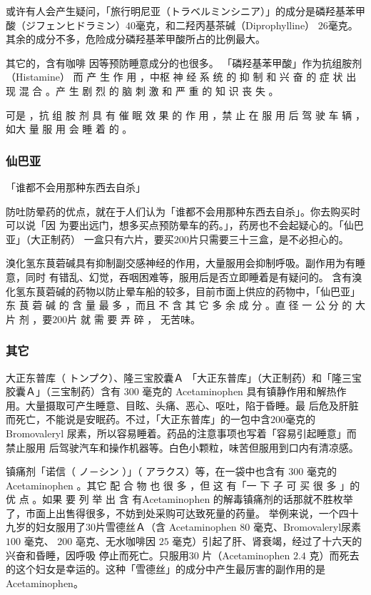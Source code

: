 \documentclass[UTF8]{ctexart}
\begin{document}
或许有人会产生疑问，「旅行明尼亚（トラベルミンシニア）」的成分是磷羟基苯甲酸（ジフェンヒドラミン）$40$毫克，和二羟丙基茶碱（Diprophylline）
$26$毫克。其余的成分不多，危险成分磷羟基苯甲酸所占的比例最大。

其它的，含有咖啡
因等预防睡意成分的也很多。 「磷羟基苯甲酸」作为抗组胺剂（Histamine）
而 产 生 作 用 ，中枢 神 经 系 统 的 抑 制 和 兴 奋 的 症 状 出 现 混 合 。产 生 剧 烈 的 脑 刺 激 和 严 重 的 知 识 丧 失 。

可是 ，抗 组 胺 剂 具 有 催 眠 效 果 的 作 用 ，禁 止 在 服 用 后 驾 驶 车 辆 ，如大 量 服 用 会 睡 着 的 。


\subsubsection{仙巴亚}
\begin{flushright}
「谁都不会用那种东西去自杀」
\end{flushright}

防吐防晕药的优点，就在于人们认为「谁都不会用那种东西去自杀」。你去购买时可以说「因
为要出远门，想多买点预防晕车的药。」，药房也不会起疑心的。「仙巴亚」（大正制药）
一盒只有六片，要买$200$片只需要三十三盒，是不必担心的。

溴化氢东茛菪碱具有抑制副交感神经的作用，大量服用会抑制呼吸。副作用为有睡意，同时
有错乱、幻觉，吞咽困难等，服用后是否立即睡着是有疑问的。
含有溴化氢东茛菪碱的药物以防止晕车船的较多，目前市面上供应的药物中，「仙巴亚」东
茛 菪 碱 的 含 量 最 多 ，而且 不 含 其 它 多 余 成 分 。直 径 一 公 分 的 大 片 剂 ，要$200$片 就 需 要 弄 碎 ， 无苦味。


\subsubsection{其它}

大正东普库（ トンプク）、隆三宝胶囊Ａ 「大正东普库」（大正制药）和「隆三宝胶囊Ａ」（三宝制药）含有 $300$ 毫克的 Acetaminophen 具有镇静作用和解热作用。大量摄取可产生睡意、目眩、头痛、恶心、呕吐，陷于昏睡。最 后危及肝脏而死亡，不能说是安眠药。不过，「大正东普库」的一包中含$200$毫克的 Bromovaleryl 尿素，所以容易睡着。药品的注意事项也写着「容易引起睡意」而禁止服用 后驾驶汽车和操作机器等。白色小颗粒，味苦但服用到口内有清凉感。

镇痛剂「诺信（ ノ－シン ）」（ アラクス）等，在一袋中也含有 $300$ 毫克的Acetaminophen 。其它 配 合 物 也 很 多 ，但 这 有「一 下 子 可 买 很 多 」的优 点 。如果 要 列 举 出 含 有Acetaminophen 的解毒镇痛剂的话那就不胜枚举了，市面上出售得很多，不妨到处采购可达致死量的药量。 举例来说，一个四十九岁的妇女服用了$30$片雪德丝Ａ（含 Acetaminophen $80$ 毫克、Bromovaleryl尿素 $100$ 毫克、\qquad \qquad
$200$ 亳克、无水咖啡因 $25$ 毫克）引起了肝、肾衰竭，经过了十六天的兴奋和昏睡，因呼吸
停止而死亡。只服用$30$ 片（Acetaminophen $2.4$
克）而死去的这个妇女是幸运的。这种「雪德丝」的成分中产生最厉害的副作用的是
Acetaminophen。
\end{document}

